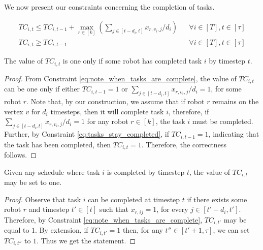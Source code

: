 \documentclass{DAC}
\begin{document}
We now present our constraints concerning the completion of tasks.

\begin{align}
    TC_{i, t} \leq TC_{i, t - 1} + \max_{r \in [k]} \left(\sum\limits_{j \in [t - d_i, t]} x_{r, v_i, j} / d_i\right) & & \forall i \in [T], t \in [\tau]\label{eq:note_when_tasks_are_complete}\\
    TC_{i, t} \geq TC_{i, t - 1} & & \forall i \in [T], t \in [\tau] \label{eq:tasks_stay_completed}
\end{align}


\begin{lemma}
    \label{lem:TC_constraints_work}
    The value of $TC_{i, t}$ is one only if some robot has completed task $i$ by timestep $t$.
\end{lemma}

\begin{proof}
    From Constraint \ref{eq:note_when_tasks_are_complete}, the value of $TC_{i, t}$ can be one only if either $TC_{i, t - 1} = 1$ or $\sum\limits_{j \in [t - d_i, t]} x_{r, v_i, j} / d_i = 1$, for some robot $r$. Note that, by our construction, we assume that if robot $r$ remains on the vertex $v$ for $d_i$ timesteps, then it will complete task $i$, therefore, if $\sum\limits_{j \in [t - d_i, t]} x_{r, v_i, j} / d_i = 1$ for any robot $r \in [k]$, the task $i$ must be completed. Further, by Constraint \ref{eq:tasks_stay_completed}, if $TC_{i, t - 1} = 1$, indicating that the task has been completed, then $TC_{i, t} = 1$.
    Therefore, the correctness follows.
\end{proof}

\begin{lemma}
    \label{lem:TC_constaints_allow_the_right_answer}
    Given any schedule where task $i$ is completed by timestep $t$, the value of $TC_{i,t}$ may be set to one.
\end{lemma}

\begin{proof}
    Observe that task $i$ can be completed at timestep $t$ if there exists some robot $r$ and timestep $t' \in [t]$ such that $x_{r, i j} = 1$, for every $j \in [t' - d_i, t']$. Therefore, by Constraint \ref{eq:note_when_tasks_are_complete}, $TC_{i, t'}$ may be equal to $1$. By extension, if $TC_{i, t'} = 1$ then, for any $t'' \in [t' + 1, \tau]$, we can set $TC_{i, t''}$ to $1$. Thus we get the statement.
\end{proof}
\end{document}
